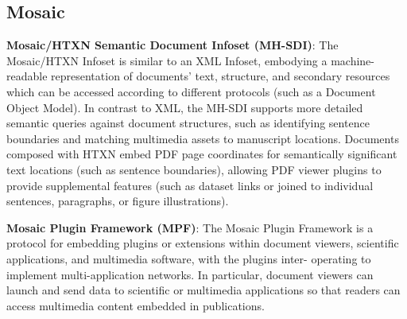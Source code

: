 \atsp
\begin{frame}{}
\section{Mosaic}

\vspace*{21pt}
{\thrulex}

{\fontsize{18}{25}\selectfont
\hspace*{25pt}\begin{minipage}{1.2\textwidth}
\vspace{-6pt}



		

{\setlength{\leftmargini}{13pt}\begin{enumerate}
\setlength{\labelsep}{13pt}
\vspace{11pt}
\dmitem \textbf{Mosaic/HTXN Semantic Document 
Infoset (MH-SDI)}:  
\hspace*{.4em} 
The Mosaic/HTXN Infoset is similar to an XML Infoset, 
embodying a machine-readable representation of documents' 
text, structure, and secondary resources which 
can be accessed according to different protocols 
(such as a Document Object Model).  In contrast to 
XML, the MH-SDI supports more detailed semantic 
queries against document structures, such as 
identifying sentence boundaries and matching 
multimedia assets to manuscript locations.  Documents 
composed with HTXN embed PDF page coordinates for 
semantically significant text locations (such as 
sentence boundaries), allowing PDF viewer plugins to 
provide supplemental features (such as dataset links or 
 joined to individual sentences, paragraphs, 
or figure illustrations).

\vspace{27pt}  
\dmitem  
\textbf{Mosaic Plugin Framework (MPF)}:  \hspace*{.4em} 
The Mosaic Plugin Framework is a \\
protocol for 
embedding plugins or extensions within document 
viewers, scientific applications, and multimedia 
software, with the plugins inter- operating to implement 
multi-application networks.  In particular, 
document viewers can launch and send data to 
scientific or multimedia applications so 
that readers can access multimedia content 
embedded in publications.


\end{enumerate}}
\end{minipage}}
\end{frame}

